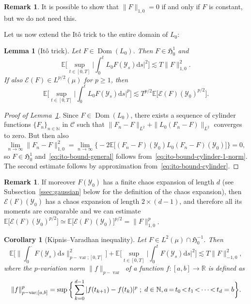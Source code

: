 \documentclass[10pt]{amsart}
\newtheorem{lemm}[theo]{Lemma}\newtheorem{prop}[theo]{Proposition}\newtheorem{coro}[theo]{Corollary}\newtheorem{conj}[theo]{Conjecture}
\theoremstyle{definition}\newtheorem{defi}[theo]{Definition}\newtheorem{rema}[theo]{Remark}\newtheorem{exam}[theo]{Example}\newtheorem{exem}[theo]{Example}\newtheorem{nota}[theo]{Notation}
\DeclareMathOperator{\Dom}{Dom}
\DeclareMathOperator{\var}{var}
\newcommand{\bb}[1]{{\mathbb #1}}
\newcommand{\mc}[1]{{\mathcal #1}}
\renewcommand{\mc}[1]{{\mathcal #1}}
\newcommand*{\dd}{\mathrm{d}}
\newcommand*{\ds}{\dd s}
\newcommand*{\Mk}{\mkern -2mu}
\begin{document}
\begin{rema}
It is possible to show that $\| F\|_{1,0} = 0$ if and only if $F$ is constant, but we do not need this.
\end{rema}

Let us now extend the It\^o trick to the entire domain of $L_0$:
\begin{lemm}[It\^o trick] \label{lem:ito}
Let $F \in \Dom (L_0)$. Then $F \in \mathfrak{H}^1_0$
and
\begin{equation}\label{eq:ito-bound-general}
\mathbb{E} \bigg[\sup_{t \in [0,T]}
\bigg| \int_0^t L_0 F (\mc Y_s) \ds \bigg|^2 \bigg] \lesssim T \| F
\|_{1,0}^2.
\end{equation}
If also $\mathcal{E} (F) \in L^{p/2}(\mu)$ for $p\geqslant 1$, then
\begin{equation}\label{eq:ito-bound-general-p}
\mathbb{E} \bigg[\sup_{t \in [0,T]}
\bigg| \int_0^t L_0 F (\mc Y_s) \ds \bigg|^p \bigg] \lesssim T^{p / 2}
\mathbb{E} \big[\mathcal{E} (F) (\mc Y_0)^{p / 2}\big].
\end{equation}
\end{lemm}

\begin{proof}[Proof of Lemma~\ref{lem:ito}]
Since $F \in \Dom (L_0)$, there exists a sequence of cylinder functions $\{F_n\}_{n\in\mathbb N}$ in $\mc C$ such that $\| F_n - F \|_{L^2} + \| L_0 (F_n - F) \|_{L^2}$ converges to zero. But then also
\[
\lim_{n \rightarrow \infty} \| F_n - F \|_{1,0}^2 = \lim_{n \rightarrow
\infty} \Big\{ - 2\mathbb{E} \big[(F_n - F)(\mc Y_0) L_0 (F_n - F)(\mc Y_0)\big]\Big\} = 0,
\]
so $F \in \mathfrak{H}_0^1$ and~\eqref{eq:ito-bound-general} follows from~\eqref{eq:ito-bound-cylinder-1-norm}. The second estimate follows by approximation from~\eqref{eq:ito-bound-cylinder}.
\end{proof}

\begin{rema}\label{rmk:chaos-moments}
If moreover $F (\mc Y_0)$ has a finite chaos expansion of length $d$ (see Subsection~\ref{ssec:gaussian} below for the definition of the chaos expansion), then $\mathcal{E} (F) (\mc Y_0)$ has a chaos expansion of length $2 \times (d - 1)$, and therefore all its moments are comparable and we can estimate $\mathbb{E} \big[\mathcal{E} (F) (\mc Y_0)^{p / 2}\big] \simeq \mathbb{E}
\big[\mathcal{E} (F) (\mc Y_0)\big]^{p / 2} = \| F \|_{1,0}^p$.
\end{rema}

\begin{coro}[Kipnis--Varadhan inequality]\label{cor:KV}
Let $F \in L^2 (\mu) \cap \mathfrak{H}^{- 1}_0$. Then
\[
\mathbb{E} \bigg[\bigg\| \int_0^{\cdot} F (\mc Y_s) \ds \bigg\|_{p - \var ; [0, T]}^2 \bigg] +\mathbb{E} \bigg[\sup_{t \in [0,T]}
\bigg| \int_0^t F (\mc Y_s) \ds \bigg|^2 \bigg] \lesssim T \| F \|_{- 1,0}^2,
\]
where the $p$-variation norm $\|f\|_{p-\var}$ of a function $f:[a,b]\to \bb R$ is defined as
\begin{equation}\label{eq:pvar}
\!\|f \|_{p - \var ; [a, b]}^p = \sup\bigg\{ \sum_{k=0}^{d-1} |f(t_{k+1}) - f(t_k)|^p\; ; \; d \in \bb N, a \Mk=\Mk t_0 \Mk<\Mk t_1 \Mk< \Mk\cdots \Mk< \Mk t_d = b\bigg\}.\!
\end{equation}
\end{coro}
\end{document}
